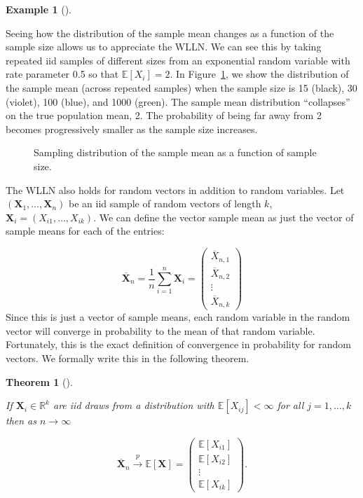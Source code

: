 \documentclass[
  13pt,
  letterpaper,
  DIV=11,
  numbers=noendperiod]{scrreprt}
\newcommand{\mb}{\symbf}
\newcommand{\E}{\mathbb{E}}
\newcommand{\Xbar}{\overline{X}}
\newcommand{\X}{\mb{X}}
\newcommand{\inprob}{\overset{p}{\to}}
\theoremstyle{definition}
\theoremstyle{definition}
\newtheorem{example}{Example}[chapter]
\theoremstyle{plain}
\newtheorem{theorem}{Theorem}[chapter]
\theoremstyle{remark}
\begin{document}
\begin{example}[]\protect\hypertarget{exm-lln}{}\label{exm-lln}

Seeing how the distribution of the sample mean changes as a function of
the sample size allows us to appreciate the WLLN. We can see this by
taking repeated iid samples of different sizes from an exponential
random variable with rate parameter 0.5 so that \(\E[X_i] = 2\). In
Figure~\ref{fig-lln-sim}, we show the distribution of the sample mean
(across repeated samples) when the sample size is 15 (black), 30
(violet), 100 (blue), and 1000 (green). The sample mean distribution
``collapses'' on the true population mean, 2. The probability of being
far away from 2 becomes progressively smaller as the sample size
increases.

\begin{figure}[th]


\caption{\label{fig-lln-sim}Sampling distribution of the sample mean as
a function of sample size.}

\end{figure}%

\end{example}

The WLLN also holds for random vectors in addition to random variables.
Let \((\X_1, \ldots, \X_n)\) be an iid sample of random vectors of
length \(k\), \(\mb{X}_i = (X_{i1}, \ldots, X_{ik})\). We can define the
vector sample mean as just the vector of sample means for each of the
entries:

\[
\overline{\mb{X}}_n = \frac{1}{n} \sum_{i=1}^n \mb{X}_i =
\begin{pmatrix}
\Xbar_{n,1} \\ \Xbar_{n,2} \\ \vdots \\ \Xbar_{n, k}
\end{pmatrix}
\] Since this is just a vector of sample means, each random variable in
the random vector will converge in probability to the mean of that
random variable. Fortunately, this is the exact definition of
convergence in probability for random vectors. We formally write this in
the following theorem.

\begin{theorem}[]\protect\hypertarget{thm-vector-wlln}{}\label{thm-vector-wlln}

If \(\X_i \in \mathbb{R}^k\) are iid draws from a distribution with
\(\E[X_{ij}] < \infty\) for all \(j=1,\ldots,k\) then as
\(n\rightarrow\infty\)

\[
\overline{\mb{X}}_n \inprob \E[\X] =
\begin{pmatrix}
\E[X_{i1}] \\ \E[X_{i2}] \\ \vdots \\ \E[X_{ik}]
\end{pmatrix}.
\]

\end{theorem}
\end{document}
